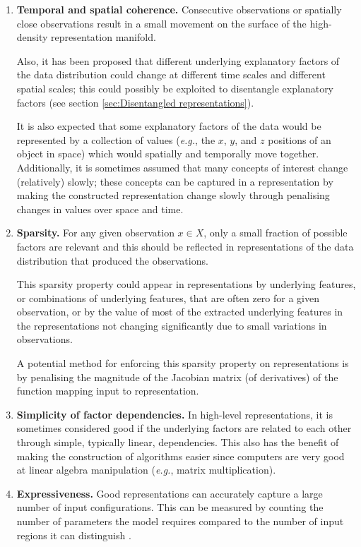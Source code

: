 \begin{enumerate}
    \item \textbf{Temporal and spatial coherence.}
    Consecutive observations or spatially close observations result in a small movement on the surface of the high-density representation manifold.

    Also, it has been proposed that different underlying explanatory factors of the data distribution could change at different time scales and different spatial scales; this could possibly be exploited to disentangle explanatory factors (see section \ref{sec:Disentangled representations}).
    
    It is also expected that some explanatory factors of the data would be represented by a collection of values (\textit{e.g.}, the $x$, $y$, and $z$ positions of an object in space) which would spatially and temporally move together.
    Additionally, it is sometimes assumed that many concepts of interest change (relatively) slowly; these concepts can be captured in a representation by making the constructed representation change slowly through penalising changes in values over space and time.

    \item \textbf{Sparsity.}
    For any given observation $x \in X$, only a small fraction of possible factors are relevant and this should be reflected in representations of the data distribution that produced the observations.
    
    This sparsity property could appear in representations by underlying features, or combinations of underlying features, that are often zero for a given observation, or by the value of most of the extracted underlying features in the representations not changing significantly due to small variations in observations.
    
    A potential method for enforcing this sparsity property on representations is by penalising the magnitude of the Jacobian matrix (of derivatives) of the function mapping input to representation.
    
    \item \textbf{Simplicity of factor dependencies.}
    In high-level representations, it is sometimes considered good if the underlying factors are related to each other through simple, typically linear, dependencies.
    This also has the benefit of making the construction of algorithms easier since computers are very good at linear algebra manipulation (\textit{e.g.}, matrix multiplication).
    
    \item \textbf{Expressiveness.} Good representations can accurately capture a large number of input configurations. This can be measured by counting the number of parameters the model requires compared to the number of input regions it can distinguish \autocite{luo2019expressiveness}.
\end{enumerate}


